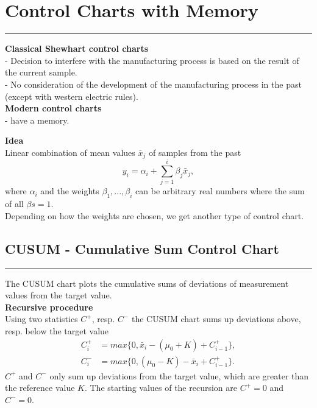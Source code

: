 \section{Control Charts with Memory}
\noindent\rule[\linienAbstand]{\linewidth}{\linienDickeDick}

\textbf{Classical Shewhart control charts}\\
 - Decision to interfere with the manufacturing process is based on the result of the current sample.\\
 - No consideration of the development of the manufacturing process in the past (except with western electric rules).\\

\textbf{Modern control charts}\\
 - have a memory.

\textbf{Idea}\\
Linear combination of mean values $\bar{x}_j$ of samples from the past
\begin{equation}
 y_i = \alpha_i + \sum_{j=1}^i \beta_j \bar{x}_j,
\end{equation}
where $\alpha_i$ and the weights $\beta_1, ..., \beta_i$ can be arbitrary real numbers where the sum of all $\beta s = 1$.\\
Depending on how the weights are chosen, we get another type of control chart.

\subsection{CUSUM - Cumulative Sum Control Chart}
\noindent\rule[\linienAbstand]{\linewidth}{\linienDicke}
The CUSUM chart plots the cumulative sums of deviations of measurement values from the target value.\\

\textbf{Recursive procedure}\\
Using two statistics $C^+$, resp. $C^-$ the CUSUM chart sums up deviations above, resp. below the target value
\begin{equation}
  \begin{split}
    C^+_i &= max\{0, \bar{x}_i - (\mu_0 + K) + C_{i-1}^+\},\\
    C^-_i &= max\{0, (\mu_0 - K) - \bar{x}_i + C_{i-1}^+\}.
  \end{split}
\end{equation}
$C^+$ and $C^-$ only sum up deviations from the target value, which are greater than the reference value $K$.
The starting values of the recursion are $C^+ = 0$ and $C^- = 0$.\\


